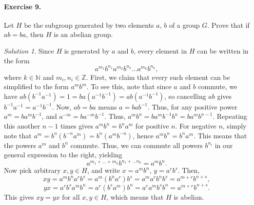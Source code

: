 \documentclass[11pt]{report}
\def\Z{\mathbb{Z}}
\def\N{\mathbb{N}}
\theoremstyle{remark}
\newtheorem*{solution}{Solution}
\begin{document}
    \paragraph{Exercise 9.} Let $H$ be the subgroup generated by two elements $a$,
    $b$ of a group $G$. Prove that if $ab = ba$, then $H$ is an abelian group.
    \begin{solution}
        Since $H$ is generated by $a$ and $b$, every element in $H$ can be written
        in the form \[
            a^{m_1}b^{n_1}a^{m_2}b^{n_2} \dots a^{m_k}b^{n_k},
        \] where $k \in \N$ and $m_i, n_i \in \Z$. First, we claim that every such
        element can be simplified to the form $a^mb^m$. To see this, note that since
        $a$ and $b$ commute, we have $ab(b^{-1}a^{-1}) = 1 = ba(a^{-1}b^{-1}) =
        ab(a^{-1}b^{-1})$, so cancelling $ab$ gives $b^{-1}a^{-1} = a^{-1}b^{-1}$.
        Now, $ab = ba$ means $a = bab^{-1}$. Thus, for any positive power $a^m =
        ba^mb^{-1}$, and $a^{-m} = ba^{-m}b^{-1}$. Thus, $a^mb^n = ba^mb^{-1}b^n =
        ba^mb^{n - 1}$. Repeating this another $n - 1$ times gives $a^mb^n =
        b^na^{m}$ for positive $n$. For negative $n$, simply note that $a^m =
        b^{n}(b^{-n}a^m) = b^n(a^mb^{-n})$, hence $a^mb^n = b^na^m$.
        This means that the powers $a^m$ and $b^n$ commute. Thus, we can commute all
        powers $b^{n_i}$ in our general expression to the right, yielding \[
            a^{m_1 + \dots + m_k}b^{n_1 + \dots n_k} = a^mb^n. 
        \] Now pick arbitrary $x, y \in H$, and write $x = a^mb^n$, $y = a^rb^s$.
        Then, \[
            xy = a^mb^na^rb^s = a^m(b^n a^r)b^s = a^ma^r b^nb^s = a^{m + r}b^{n +
            s}, 
        \] \[
            yx = a^rb^sa^mb^n = a^r(b^s a^m)b^n = a^ra^m b^sb^n = a^{m + r}b^{n +
            s}. 
        \] This gives $xy = yx$ for all $x, y \in H$, which means that $H$ is abelian.
    \end{solution}
\end{document}
